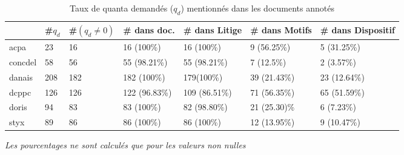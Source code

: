 \begin{table}[!htb]
	\scriptsize
	\begin{tabular}{|l|l|l|l|l|l|l|}
		\hline
		 & \textbf{\#$q_d$} & \textbf{\#$(q_d\neq 0)$} & \textbf{\# dans doc.} & \textbf{\# dans Litige} & \textbf{\# dans Motifs} & \textbf{\# dans Dispositif} \\ \hline
		acpa               & 23                   & 16                                           & 16 (100\%)                   & 16 (100\%)              & 9 (56.25\%)             & 5 (31.25\%)                 \\ \hline
		concdel            & 58                   & 56                                           & 55 (98.21\%)                 & 55 (98.21\%)            & 7 (12.5\%)              & 2 (3.57\%)                  \\ \hline
		danais             & 208                  & 182                                          & 182 (100\%)                  & 179(100\%)              & 39 (21.43\%)            & 23 (12.64\%)                \\ \hline
		dcppc              & 126                  & 126                                          & 122 (96.83\%)                & 109 (86.51\%)           & 71 (56.35\%)            & 65 (51.59\%)                \\ \hline
		doris              & 94                   & 83                                           & 83 (100\%)                   & 82 (98.80\%)            & 21 (25.30)\%            & 6 (7.23\%)                  \\ \hline
		styx               & 89                   & 86                                           & 86 (100\%)                   & 86 (100\%)              & 12 (13.95\%)            & 9 (10.47\%)                 \\ \hline
	\end{tabular}
\textit{Les pourcentages ne sont calculés que pour les valeurs non nulles}
\caption{Taux de quanta demandés ($q_d$) mentionnés dans les documents annotés} \label{tab:quanta:mentionQd}
\end{table}

